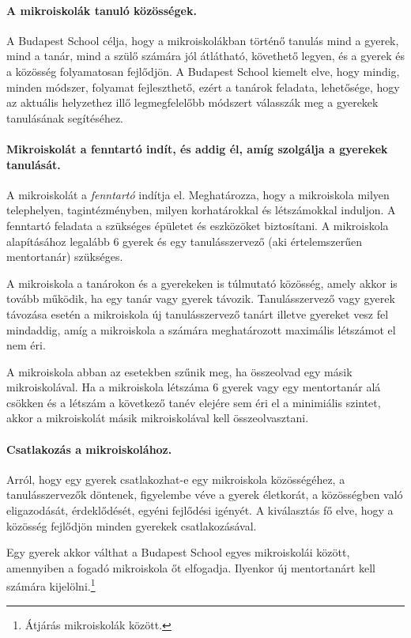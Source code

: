 \paragraph{A mikroiskolák tanuló közösségek.}
A Budapest School célja, hogy a mikroiskolákban történő tanulás mind a gyerek,
mind a tanár, mind a szülő számára jól átlátható, követhető legyen, és a gyerek
és a közösség folyamatosan fejlődjön.
A Budapest School kiemelt elve, hogy mindig, minden módszer, folyamat
fejleszthető, ezért a tanárok feladata, lehetősége, hogy az aktuális helyzethez
illő legmegfelelőbb módszert válasszák meg a gyerekek tanulásának segítéséhez.

\paragraph{Mikroiskolát a fenntartó indít, és addig él, amíg szolgálja a
      gyerekek tanulását.}
A mikroiskolát a \emph{fenntartó} indítja el. Meghatározza, hogy a mikroiskola milyen telephelyen,
tagintézményben, milyen korhatárokkal és létszámokkal
induljon. A fenntartó feladata a szükséges épületet és eszközöket
biztosítani. A
mikroiskola alapításához legalább 6 gyerek és egy tanulásszervező (aki
értelemszerűen mentortanár)
szükséges.

A mikroiskola a tanárokon és a gyerekeken is túlmutató közösség, amely akkor is
tovább működik, ha egy tanár vagy gyerek távozik. Tanulásszervező vagy
gyerek távozása esetén a mikroiskola  új tanulásszervező tanárt illetve gyereket
vesz fel mindaddig, amíg a mikroiskola a számára meghatározott maximális
létszámot el nem éri.

A mikroiskola abban az esetekben szűnik meg, ha összeolvad egy másik
mikroiskolával. Ha a mikroiskola létszáma 6 gyerek vagy egy mentortanár alá csökken és
a létszám a következő tanév elejére sem éri el a minimiális szintet, akkor a mikroiskolát másik
mikroiskolával kell összeolvasztani.

\paragraph{Csatlakozás a mikroiskolához.}
Arról, hogy egy gyerek csatlakozhat-e egy mikroiskola közösségéhez, a
tanulásszervezők
döntenek, figyelembe véve a gyerek életkorát, a közösségben való
eligazodását, érdeklődését, egyéni fejlődési igényét. A kiválasztás fő elve, 
hogy a közösség fejlődjön minden gyerekek csatlakozásával.


Egy gyerek akkor válthat a Budapest School egyes mikroiskolái között,
amennyiben a fogadó mikroiskola őt elfogadja. Ilyenkor új mentortanárt kell
számára kijelölni.\footnote{Átjárás mikroiskolák között.}
